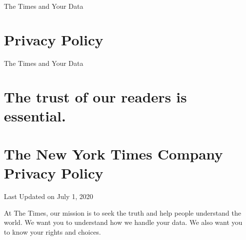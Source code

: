 The Times and Your Data

\hypertarget{privacy-policy}{%
\section{Privacy Policy}\label{privacy-policy}}

The Times and Your Data

\hypertarget{the-trust-of-our-readers-is-essential}{%
\section{The trust of our readers is
essential.}\label{the-trust-of-our-readers-is-essential}}

\hypertarget{the-new-york-times-company-privacy-policy}{%
\section{The New York Times Company Privacy
Policy}\label{the-new-york-times-company-privacy-policy}}

Last Updated on July 1, 2020

At The Times, our mission is to seek the truth and help people
understand the world. We want you to understand how we handle your data.
We also want you to know your rights and choices.

